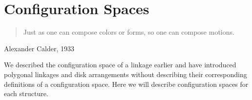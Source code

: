 \section{Configuration Spaces}
\begin{quote}
Just as one can compose colors or forms, so one can compose motions.
\end{quote}
{\raggedright{}Alexander Calder, 1933}


We described the configuration space of a linkage earlier and have introduced polygonal linkages and disk arrangements without describing their corresponding definitions of a configuration space.  Here we will describe configuration spaces for each structure.







